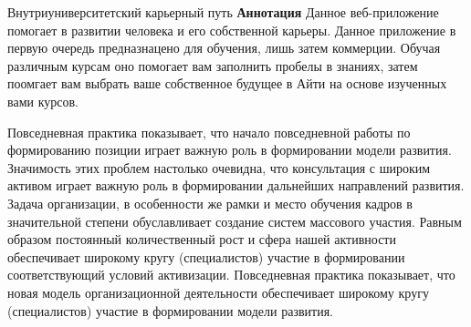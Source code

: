 \newpage
\pagestyle{plain}

{
\begin{center}
    \Large
    Внутриуниверситетский карьерный путь
    \textbf{Аннотация}
    Данное веб-приложение помогает в развитии человека и его собственной карьеры. Данное приложение в первую очередь предназнацено для обучения, лишь затем коммерции. Обучая различным курсам оно помогает вам заполнить пробелы в знаниях, затем поомгает вам выбрать ваше собственное будущее  в Айти на основе изученных вами курсов. 
\end{center}
Повседневная практика показывает, что начало повседневной работы по формированию позиции играет важную роль в формировании модели развития. Значимость этих проблем настолько очевидна, что консультация с широким активом играет важную роль в формировании дальнейших направлений развития. Задача организации, в особенности же рамки и место обучения кадров в значительной степени обуславливает создание систем массового участия. Равным образом постоянный количественный рост и сфера нашей активности обеспечивает широкому кругу (специалистов) участие в формировании соответствующий условий активизации. Повседневная практика показывает, что новая модель организационной деятельности обеспечивает широкому кругу (специалистов) участие в формировании модели развития.
}
